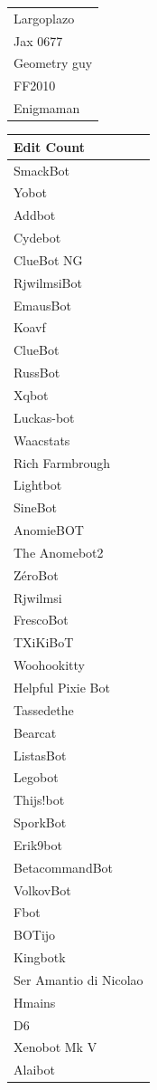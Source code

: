 \documentclass{article}
\begin{document}
\begin{landscape}
\begin{table}
\begin{center}
\begin{tabular}{l}
Largoplazo \\
Jax 0677 \\
Geometry guy \\
FF2010 \\
Enigmaman \\
\end{tabular}
\begin{tabular}{l} 
\hline
 Edit Count \\
\hline
SmackBot \\
Yobot \\
Addbot \\
Cydebot \\
ClueBot NG \\
RjwilmsiBot \\
EmausBot \\
Koavf \\
ClueBot \\
RussBot \\
Xqbot \\
Luckas-bot \\
Waacstats \\
Rich Farmbrough \\
Lightbot \\
SineBot \\
AnomieBOT \\
The Anomebot2 \\
ZéroBot \\
Rjwilmsi \\
FrescoBot \\
TXiKiBoT \\
Woohookitty \\
Helpful Pixie Bot \\
Tassedethe \\
Bearcat \\
ListasBot \\
Legobot \\
Thijs!bot \\
SporkBot \\
Erik9bot \\
BetacommandBot \\
VolkovBot \\
Fbot \\
BOTijo \\
Kingbotk \\
Ser Amantio di Nicolao \\
Hmains \\
D6 \\
Xenobot Mk V \\
Alaibot \\

\end{tabular}
\end{center}
\end{table}
\end{landscape}
\end{document}
